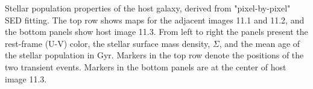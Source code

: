 \label{fig:HostProperties}
Stellar population properties of the \spock host galaxy, derived from "pixel-by-pixel" SED fitting. 
The top row shows maps for the adjacent images 11.1 and 11.2, and the bottom panels show host image 11.3.  From left to right the panels present the rest-frame (U-V) color, the stellar surface mass density, $\Sigma$, and the mean age of the stellar population in Gyr.  Markers in the top row denote the positions of the two \spock transient events. Markers in the bottom panels are at the center of host image 11.3. 